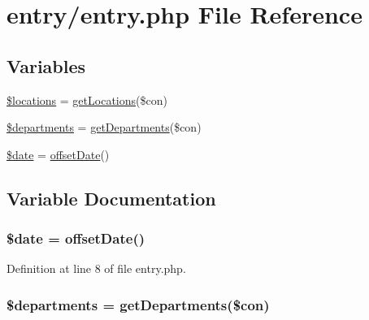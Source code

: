 \hypertarget{entry_8php}{}\section{entry/entry.php File Reference}
\label{entry_8php}
\subsection*{Variables}
\begin{DoxyCompactItemize}
\item 
\hyperlink{entry_8php_ad6ba91f5c932dec6e72487c45999806b}{\$locations} = \hyperlink{management_library_8php_a80f0f920d3c753bb4d3ce744c602f22c}{get\+Locations}(\$con)
\item 
\hyperlink{entry_8php_ae2ea4305886b612a4ca8efa178aaec9c}{\$departments} = \hyperlink{entry_library_8php_a3144a911d05c41bd6eb0fc32c7ad02b9}{get\+Departments}(\$con)
\item 
\hyperlink{entry_8php_a481c918f8d853749e00b5942cabf599a}{\$date} = \hyperlink{entry_library_8php_ac13edd684574861a5e26f7e0f84ef5a3}{offset\+Date}()
\end{DoxyCompactItemize}


\subsection{Variable Documentation}
\subsubsection[{\texorpdfstring{\$date}{$date}}]{\setlength{\rightskip}{0pt plus 5cm}\$date = {\bf offset\+Date}()}\hypertarget{entry_8php_a481c918f8d853749e00b5942cabf599a}{}\label{entry_8php_a481c918f8d853749e00b5942cabf599a}


Definition at line 8 of file entry.\+php.

\subsubsection[{\texorpdfstring{\$departments}{$departments}}]{\setlength{\rightskip}{0pt plus 5cm}\$departments = {\bf get\+Departments}(\$con)}\hypertarget{entry_8php_ae2ea4305886b612a4ca8efa178aaec9c}{}\label{entry_8php_ae2ea4305886b612a4ca8efa178aaec9c}


